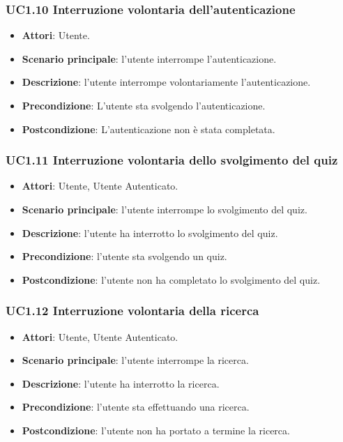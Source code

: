 \subsubsection{UC1.10 Interruzione volontaria dell'autenticazione}
\begin{itemize}
\item \textbf{Attori}: Utente.
\item \textbf{Scenario principale}: l'utente interrompe l'autenticazione.
\item \textbf{Descrizione}: l'utente interrompe volontariamente l'autenticazione.
\item \textbf{Precondizione}: L'utente sta svolgendo l'autenticazione.
\item \textbf{Postcondizione}: L'autenticazione non è stata completata.
\end{itemize}
\subsubsection{UC1.11 Interruzione volontaria dello svolgimento del quiz}
\begin{itemize}
\item \textbf{Attori}: Utente, Utente Autenticato.
\item \textbf{Scenario principale}: l'utente interrompe lo svolgimento del quiz.
\item \textbf{Descrizione}: l'utente ha interrotto lo svolgimento del quiz.
\item \textbf{Precondizione}: l'utente sta svolgendo un quiz.
\item \textbf{Postcondizione}: l'utente non ha completato lo svolgimento del quiz.
\end{itemize}
\subsubsection{UC1.12 Interruzione volontaria della ricerca}
\begin{itemize}
\item \textbf{Attori}: Utente, Utente Autenticato.
\item \textbf{Scenario principale}: l'utente interrompe la ricerca.
\item \textbf{Descrizione}: l'utente ha interrotto la ricerca.
\item \textbf{Precondizione}: l'utente sta effettuando una ricerca.
\item \textbf{Postcondizione}: l'utente non ha portato a termine la ricerca.
\end{itemize}

